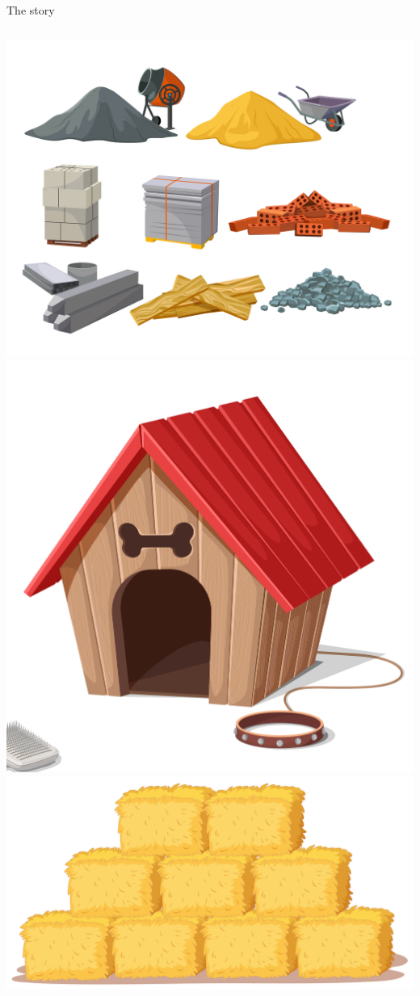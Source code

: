 \documentclass[8pt]{beamer}
\begin{document}
\begin{frame}{The story}
            \begin{columns}
                \centering
                \includegraphics[width=.95\textwidth]{images/brick}
                \centering
                \includegraphics[width=.95\textwidth]{images/sticks}
                \centering
                \includegraphics[width=.95\textwidth]{images/straw}
            \end{columns}
        \end{frame}
\end{document}
